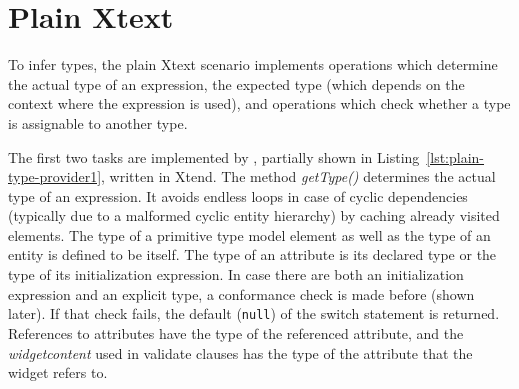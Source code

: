 \section{Plain Xtext}
\label{sec:plain-xtext}

To infer types, the plain Xtext scenario implements operations which determine
the actual type of an expression, the expected type (which depends on the
context where the expression is used), and operations which check whether a type
is assignable to another type.

The first two tasks are implemented by , partially
shown in Listing~\ref{lst:plain-type-provider1}, written in Xtend. The method
\emph{getType()} determines the actual type of an expression. It avoids endless
loops in case of cyclic dependencies (typically due to a malformed cyclic entity
hierarchy) by caching already visited elements.  The type of a primitive type
model element as well as the type of an entity is defined to be itself. The type
of an attribute is its declared type or the type of its initialization
expression.  In case there are both an initialization expression and an explicit type, a
conformance check is made before (shown later). If that
check fails, the default (\verb|null|) of the switch statement is returned.
References to attributes have the type of the referenced attribute, and the
\emph{widgetcontent} used in validate clauses has the type of the attribute that
the widget refers to.


%

